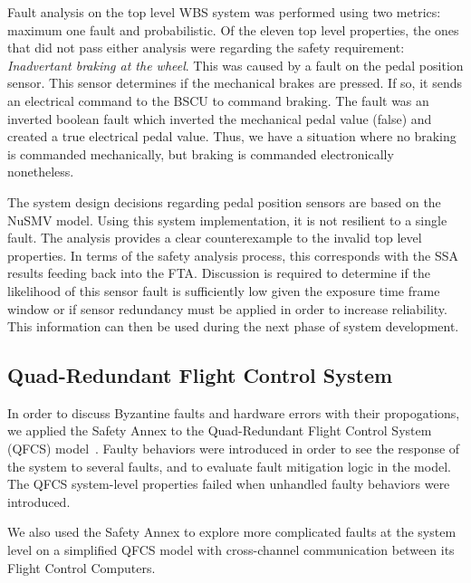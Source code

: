 Fault analysis on the top level WBS system was performed using two metrics: maximum one fault and probabilistic. Of the eleven top level properties, the ones that did not pass either analysis were regarding the safety requirement: \textit{Inadvertant braking at the wheel}. This was caused by a fault on the pedal position sensor. This sensor determines if the mechanical brakes are pressed. If so, it sends an electrical command to the BSCU to command braking. The fault was an inverted boolean fault which inverted the mechanical pedal value (false) and created a true electrical pedal value. Thus, we have a situation where no  braking is commanded mechanically, but braking is commanded electronically nonetheless. 

The system design decisions regarding pedal position sensors are based on the NuSMV model. Using this system implementation, it is not resilient to a single fault. The analysis provides a clear counterexample to the invalid top level properties. In terms of the safety analysis process, this corresponds with the SSA results feeding back into the FTA. Discussion is required to determine if the likelihood of this sensor fault is sufficiently low given the exposure time frame window or if sensor redundancy must be applied in order to increase reliability. This information can then be used during the next phase of system development. 


\subsection{Quad-Redundant Flight Control System}
In order to discuss Byzantine faults and hardware errors with their propogations, we applied the Safety Annex to the Quad-Redundant Flight Control System (QFCS) model~\cite{QFCS15:backes}. Faulty behaviors were introduced in order to see the response of the system to several faults, and to evaluate fault mitigation logic in the model.  The QFCS system-level properties failed when unhandled faulty behaviors were introduced.

We also used the Safety Annex to explore more complicated faults at the system level on a simplified QFCS model with cross-channel communication between its Flight Control Computers.

